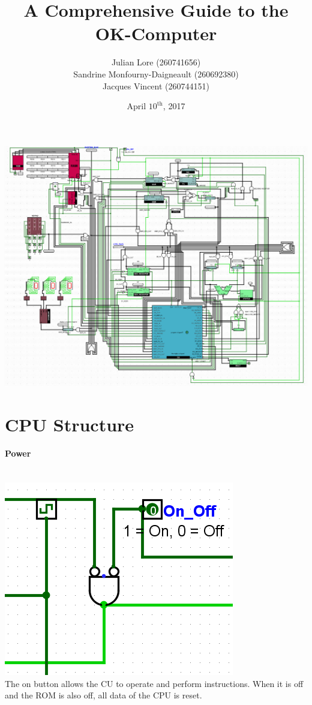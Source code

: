 \documentclass{mcgillhomework}
\title{A Comprehensive Guide to the OK-Computer}
\date{April $\text{10}^{\text{th}}$, 2017}
\author{Julian Lore (260741656)
\\ Sandrine Monfourny-Daigneault (260692380)
\\ Jacques Vincent (260744151)}
\begin{document}
\maketitle
\begin{center}
		\includegraphics[scale=0.4]{CPU}
	\end{center}
		\tableofcontents
		\newpage
	\pagestyle{mainmatter}
	\pagestyle{myheadings}
	\section{CPU Structure}
	\paragraph{Power}~
	\\ \includegraphics[scale=0.5]{ON}\\The on button allows the CU to operate and perform instructions. When it is off and the ROM is also off, all data of the CPU is reset.
\end{document}
